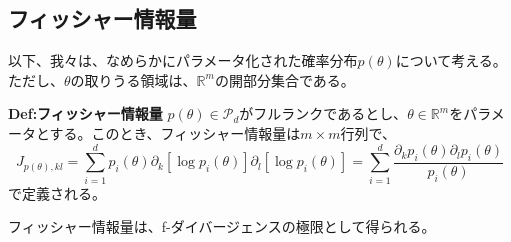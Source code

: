 \documentclass[a4paper,11pt]{jsarticle}
\numberwithin{equation}{section}
\begin{document}
\subsection{フィッシャー情報量}
以下、我々は、なめらかにパラメータ化された確率分布$p(\theta)$について考える。ただし、$\theta$の取りうる領域は、$\mathbb{R}^m$の開部分集合である。\\
\begin{itembox}[l]{\textbf{Def:フィッシャー情報量}}
    $p(\theta) \in \mathcal{P}_d$がフルランクであるとし、$\theta \in \mathbb{R}^m$をパラメータとする。このとき、フィッシャー情報量は$m \times m$行列で、
    \begin{equation}
        J_{p(\theta),kl} = \sum_{i=1}^{d}p_i(\theta)\partial_k[ \log p_i(\theta)]\partial_l[ \log p_i(\theta)] = \sum_{i=1}^{d}\frac{\partial_k p_i(\theta)\partial_l p_i(\theta)}{p_i(\theta)}
    \end{equation}
    で定義される。
\end{itembox}
フィッシャー情報量は、f-ダイバージェンスの極限として得られる。%
\end{document}

